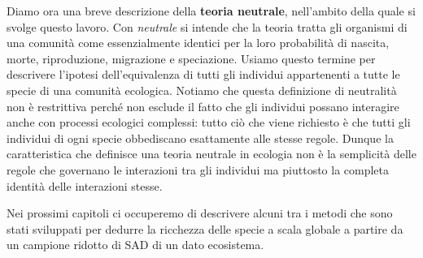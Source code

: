 Diamo ora una breve descrizione della \textbf{teoria neutrale}, nell'ambito della quale si svolge questo lavoro\cite{Hubbell}. Con \emph{neutrale} si intende che la teoria tratta gli organismi di una comunità come essenzialmente identici per la loro probabilità di nascita, morte, riproduzione, migrazione e speciazione. Usiamo questo termine per descrivere l'ipotesi dell'equivalenza di tutti gli individui appartenenti a tutte le specie di una comunità ecologica. Notiamo che questa definizione di neutralità non è restrittiva perché non esclude il fatto che gli individui possano interagire anche con processi ecologici complessi: tutto ciò che viene richiesto è che tutti gli individui di ogni specie obbediscano esattamente alle stesse regole. Dunque la caratteristica che definisce una teoria neutrale in ecologia non è la semplicità delle regole che governano le interazioni tra gli individui ma piuttosto la completa identità delle interazioni stesse.



Nei prossimi capitoli ci occuperemo di descrivere alcuni tra i metodi che sono stati sviluppati per dedurre la ricchezza delle specie a scala globale a partire da un campione ridotto di SAD di un dato ecosistema. 








%



           

